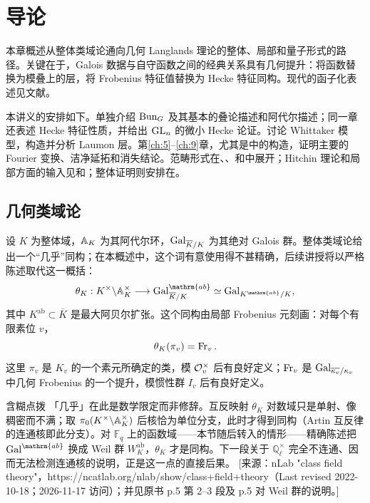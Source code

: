 \chapter{导论}\label{ch:1}
本章概述从整体类域论通向几何 Langlands 理论的整体、局部和量子形式的路径。关键在于，Galois 数据与自守函数之间的经典关系具有几何提升：将函数替换为模叠上的层，将 Frobenius 特征值替换为 Hecke 特征同构。现代的函子化表述见文献\cite{GR24a,AG15}。

本讲义的安排如下。单独介绍 $\operatorname{Bun}_G$ 及其基本的叠论描述和阿代尔描述；同一章还表述 Hecke 特征性质，并给出 $\operatorname{GL}_n$ 的微小 Hecke 论证。讨论 Whittaker 模型，构造并分析 Laumon 层。第\ref{ch:5}–\ref{ch:9}章，尤其是中的构造，证明主要的 Fourier 变换、洁净延拓和消失结论。范畴形式在、、和中展开；Hitchin 理论和局部方面的输入见和；整体证明则安排在。

\section{几何类域论}\label{sec:1.1}
设 $K$ 为整体域，$\mathbb{A}_K$ 为其阿代尔环，$\operatorname{Gal}_{\overline K/K}$ 为其绝对 Galois 群。整体类域论给出一个“几乎”同构；在本概述中，这个词有意使用得不甚精确，后续讲授将以严格陈述取代这一概括：
\[
\theta_K:K^\times\backslash\A_K^\times\longrightarrow
\Gal_{\overline K/K}^{\mathrm{ab}}\simeq\Gal_{K^{\mathrm{ab}}/K},
\]
其中 $K^{\mathrm{ab}}\subset\overline K$ 是最大阿贝尔扩张。这个同构由局部 Frobenius 元刻画：对每个有限素位 $v$，
\[\theta_K(\pi_v)=\operatorname{Fr}_v.\]
这里 $\pi_v$ 是 $K_v$ 的一个素元所确定的类，模 $\mathcal{O}_v^\times$ 后有良好定义；$\operatorname{Fr}_v$ 是 $\operatorname{Gal}_{\overline{\kappa_v}/\kappa_v}$ 中几何 Frobenius 的一个提升，模惯性群 $I_v$ 后有良好定义。

\begin{transnote}{含糊点拨}
「几乎」在此是数学限定而非修辞。互反映射 $\theta_K$ 对数域只是单射、像稠密而不满；取 $\pi_0(K^\times\backslash\mathbb{A}_K^\times)$ 后核恰为单位分支，此时才得到同构（Artin 互反律的连通核即此分支）。对 $\mathbb F_q$ 上的函数域——本节随后转入的情形——精确陈述把 $\Gal^{\mathrm{ab}}$ 换成 Weil 群 $W_K^{\mathrm{ab}}$，$\theta_K$ 才是同构。下一段关于 $\mathbb Q_\ell^\times$ 完全不连通、因而无法检测连通核的说明，正是这一点的直接后果。
[来源：nLab "class field theory"，https://ncatlab.org/nlab/show/class+field+theory（Last revised 2022-10-18；2026-11-17 访问）；并见原书 p.5 第 2–3 段及 p.5 对 Weil 群的说明。]
\end{transnote}

